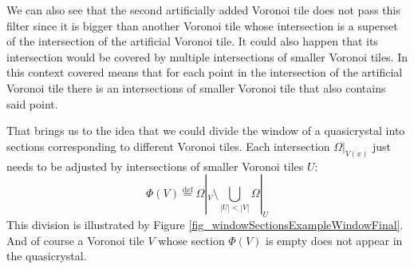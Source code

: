 \documentclass[text.tex]{subfiles}
\begin{document}
We can also see that the second artificially added Voronoi tile does not pass this filter since it is bigger than another Voronoi tile whose intersection is a superset of the intersection of the artificial Voronoi tile. It could also happen that its intersection would be covered by multiple intersections of smaller Voronoi tiles. In this context covered means that for each point in the intersection of the artificial Voronoi tile there is an intersections of smaller Voronoi tile that also contains said point. 


That brings us to the idea that we could divide the window of a quasicrystal into sections corresponding to different Voronoi tiles. Each intersection $\Omega|_{V(x)}$ just needs to be adjusted by intersections of smaller Voronoi tiles $U$: 
$$\Phi(V) \overset{\text{def}}{=} \Omega|_{V}\setminus\bigcup_{|U|<|V|}\Omega|_{U}$$
This division is illustrated by Figure \ref{fig_windowSectionsExampleWindowFinal}. And of course a Voronoi tile $V$ whose section $\Phi(V)$ is empty does not appear in the quasicrystal. 
\end{document}
